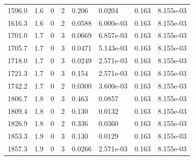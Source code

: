 \documentclass[preview]{standalone}
\begin{document}
{{{\begin{tabular}{L{1.2cm}C{1.2cm} C{0.3cm}C{0.5cm} C{1.4cm}C{1.4cm} C{1.4cm}C{1.4cm}}
  1596.0  &   1.6  & 0     &  2 &  0.206  & 0.0204  & 0.163 &  8.155e-03   \\ 
  1616.3  &   1.6  & 0     &  2 &  0.0588  & 6.000e-03  & 0.163 &  8.155e-03   \\ 
  1701.0  &   1.7  & 0     &  3 &  0.0669  & 6.857e-03  & 0.163 &  8.155e-03   \\ 
  1705.7  &   1.7  & 0     &  3 &  0.0471  & 5.143e-03  & 0.163 &  8.155e-03   \\ 
  1718.0  &   1.7  & 0     &  3 &  0.0249  & 2.571e-03  & 0.163 &  8.155e-03   \\ 
  1721.3  &   1.7  & 0     &  3 &  0.154  & 2.571e-03  & 0.163 &  8.155e-03   \\ 
  1742.2  &   1.7  & 0     &  2 &  0.0300  & 3.600e-03  & 0.163 &  8.155e-03   \\ 
  1806.7  &   1.8  & 0     &  3 &  0.463  & 0.0857  & 0.163 &  8.155e-03   \\ 
  1809.4  &   1.8  & 0     &  2 &  0.130  & 0.0132  & 0.163 &  8.155e-03   \\ 
  1826.9  &   1.8  & 0     &  2 &  0.336  & 0.0360  & 0.163 &  8.155e-03   \\ 
  1853.3  &   1.9  & 0     &  3 &  0.130  & 0.0129  & 0.163 &  8.155e-03   \\ 
  1857.3  &   1.9  & 0     &  3 &  0.0266  & 2.571e-03  & 0.163 &  8.155e-03   \\ 
\hline 
\end{tabular} 

}}}
\end{document}
